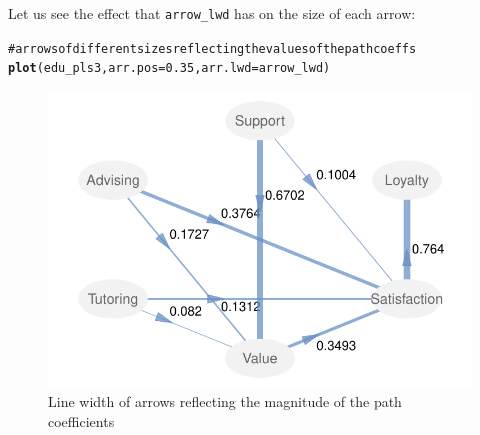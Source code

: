 \documentclass[12pt]{book}\usepackage{graphicx, color}
\makeatletter
\newcommand{\hlfunctioncall}[1]{\textcolor[rgb]{0.501960784313725,0,0.329411764705882}{\textbf{#1}}}%
\newcommand{\hlcomment}[1]{\textcolor[rgb]{0.180392156862745,0.6,0.341176470588235}{#1}}%
\newenvironment{kframe}{%
 \def\at@end@of@kframe{}%
 \ifinner\ifhmode%
  \def\at@end@of@kframe{\end{minipage}}%
  \begin{minipage}{\columnwidth}%
 \fi\fi%
 \def\FrameCommand##1{\hskip\@totalleftmargin \hskip-\fboxsep
 \colorbox{shadecolor}{##1}\hskip-\fboxsep
     \hskip-\linewidth \hskip-\@totalleftmargin \hskip\columnwidth}%
 \MakeFramed {\advance\hsize-\width
   \@totalleftmargin\z@ \linewidth\hsize
   \@setminipage}}%
 {\par\unskip\endMakeFramed%
 \at@end@of@kframe}
\newenvironment{knitrout}{}{} %
\newcommand{\code}[1]{\texttt{#1}}
\makeatother
\begin{document}
Let us see the effect that \code{arrow\_lwd} has on the size of each arrow:
\begin{knitrout}
\color{fgcolor}\begin{kframe}
\begin{alltt}
\hlcomment{# arrows of different sizes reflecting the values of the path coeffs}
\hlfunctioncall{plot}(edu_pls3, arr.pos = 0.35, arr.lwd = arrow_lwd)
\end{alltt}
\end{kframe}\begin{figure}[h]


{\centering \includegraphics[width=.8\linewidth,height=.5\linewidth]{figure/edu_pls3_plot_inner3} 

}

\caption[Line width of arrows reflecting the magnitude of the path coefficients]{Line width of arrows reflecting the magnitude of the path coefficients\label{fig:edu_pls3_plot_inner3}}
\end{figure}


\end{knitrout}
\end{document}
